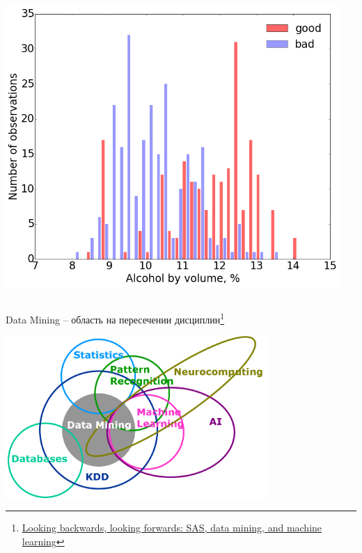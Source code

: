 \documentclass[aspectratio=169]{beamer}
\begin{document}
\begin{frame}
\begin{columns}[c]
\begin{column}{.49\linewidth}
    \begin{center}
\includegraphics[width=0.95\textwidth]{images/wine.png}
\end{center}   
    \end{column}
\end{columns}

\end{frame}

\begin{frame}{Data Mining -- область на пересечении дисциплин\footnote{\href{http://blogs.sas.com/content/subconsciousmusings/2014/08/22/looking-backwards-looking-forwards-sas-data-mining-and-machine-learning/}{Looking backwards, looking forwards: SAS, data mining, and machine learning}}}

\begin{center}
\includegraphics[width=0.75\textwidth]{images/data-mining-venn.png}
\end{center}

\end{frame}
\end{document}
